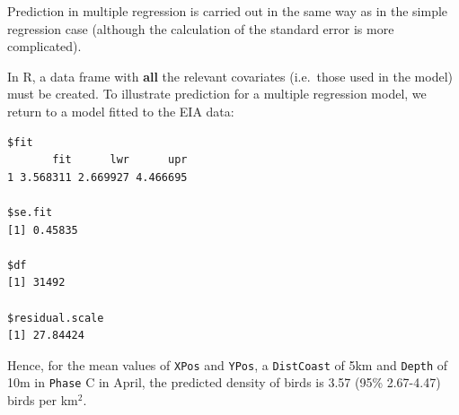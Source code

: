 \documentclass[
  oneside]{krantz}
\newenvironment{Shaded}{\begin{snugshade}}{\end{snugshade}}
\newcommand{\AttributeTok}[1]{\textcolor[rgb]{0.77,0.63,0.00}{#1}}
\newcommand{\CommentTok}[1]{\textcolor[rgb]{0.56,0.35,0.01}{\textit{#1}}}
\newcommand{\ConstantTok}[1]{\textcolor[rgb]{0.00,0.00,0.00}{#1}}
\newcommand{\DecValTok}[1]{\textcolor[rgb]{0.00,0.00,0.81}{#1}}
\newcommand{\FloatTok}[1]{\textcolor[rgb]{0.00,0.00,0.81}{#1}}
\newcommand{\FunctionTok}[1]{\textcolor[rgb]{0.00,0.00,0.00}{#1}}
\newcommand{\NormalTok}[1]{#1}
\newcommand{\OtherTok}[1]{\textcolor[rgb]{0.56,0.35,0.01}{#1}}
\newcommand{\SpecialCharTok}[1]{\textcolor[rgb]{0.00,0.00,0.00}{#1}}
\newcommand{\StringTok}[1]{\textcolor[rgb]{0.31,0.60,0.02}{#1}}
\begin{document}
Prediction in multiple regression is carried out in the same way as in the simple regression case (although the calculation of the standard error is more complicated).

In R, a data frame with \textbf{all} the relevant covariates (i.e.~those used in the model) must be created. To illustrate prediction for a multiple regression model, we return to a model fitted to the EIA data:

\begin{Shaded}
\end{Shaded}

\begin{verbatim}
$fit
       fit      lwr      upr
1 3.568311 2.669927 4.466695

$se.fit
[1] 0.45835

$df
[1] 31492

$residual.scale
[1] 27.84424
\end{verbatim}

Hence, for the mean values of \texttt{XPos} and \texttt{YPos}, a \texttt{DistCoast} of 5km and \texttt{Depth} of 10m in \texttt{Phase} C in April, the predicted density of birds is 3.57 (95\% 2.67-4.47) birds per km\(^2\).
\end{document}
